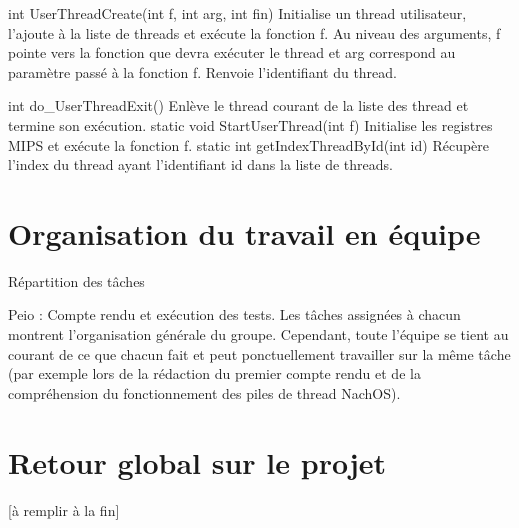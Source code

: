\documentclass[12pt]{report}
\begin{document}
int UserThreadCreate(int f, int arg, int fin)
Initialise un thread utilisateur, l’ajoute à la liste de threads et exécute la fonction f. Au niveau des arguments, f pointe vers la fonction que devra exécuter le thread et arg correspond au paramètre passé à la fonction f. Renvoie l’identifiant du thread.


int do\_UserThreadExit()
Enlève le thread courant de la liste des thread et termine son exécution.
static void StartUserThread(int f)
Initialise les registres MIPS et exécute la fonction f.
static int getIndexThreadById(int id)
Récupère l’index du thread ayant l’identifiant id dans la liste de threads.




\chapter{Organisation du travail en équipe}
Répartition des tâches

Peio : Compte rendu et exécution des tests.
Les tâches assignées à chacun montrent l’organisation générale du groupe. Cependant, toute l’équipe se tient au courant de ce que chacun fait et peut ponctuellement travailler sur la même tâche (par exemple lors de la rédaction du premier compte rendu et de la compréhension du fonctionnement des piles de thread NachOS).


\chapter{Retour global sur le projet}

[à remplir à la fin]
\end{document}
